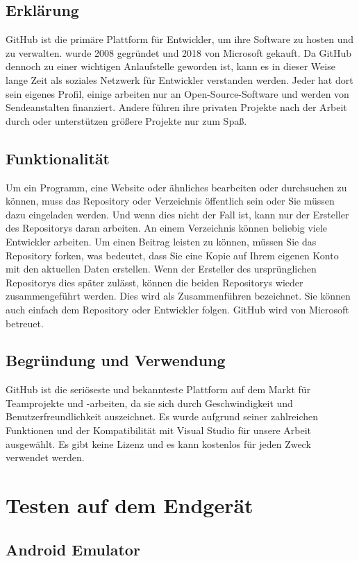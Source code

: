 \subsection*{Erklärung}
GitHub ist die primäre Plattform für Entwickler, um ihre Software zu hosten 
und zu verwalten. wurde 2008 gegründet und 2018 von Microsoft gekauft. 
Da GitHub dennoch zu einer wichtigen Anlaufstelle geworden ist, 
kann es in dieser Weise lange Zeit als soziales Netzwerk für Entwickler 
verstanden werden. Jeder hat dort sein eigenes Profil, einige arbeiten 
nur an Open-Source-Software und werden von Sendeanstalten finanziert. 
Andere führen ihre privaten Projekte nach der Arbeit durch oder unterstützen 
größere Projekte nur zum Spaß.
\subsection*{Funktionalität}
Um ein Programm, eine Website oder ähnliches bearbeiten oder durchsuchen zu können, 
muss das Repository oder Verzeichnis öffentlich sein oder Sie müssen dazu eingeladen 
werden. Und wenn dies nicht der Fall ist, kann nur der Ersteller des Repositorys 
daran arbeiten. An einem Verzeichnis können beliebig viele Entwickler arbeiten. 
Um einen Beitrag leisten zu können, müssen Sie das Repository forken, was bedeutet, 
dass Sie eine Kopie auf Ihrem eigenen Konto mit den aktuellen Daten erstellen. 
Wenn der Ersteller des ursprünglichen Repositorys dies später zulässt, können die 
beiden Repositorys wieder zusammengeführt werden. Dies wird als Zusammenführen 
bezeichnet. Sie können auch einfach dem Repository oder Entwickler folgen. 
GitHub wird von Microsoft betreuet.
\subsection*{Begründung und Verwendung}
GitHub ist die seriöseste und bekannteste Plattform auf dem Markt für Teamprojekte 
und -arbeiten, da sie sich durch Geschwindigkeit und Benutzerfreundlichkeit 
auszeichnet. Es wurde aufgrund seiner zahlreichen Funktionen und der Kompatibilität 
mit Visual Studio für unsere Arbeit ausgewählt. Es gibt keine Lizenz und es kann 
kostenlos für jeden Zweck verwendet werden.
\newpage

\section{Testen auf dem Endgerät}
\subsection{Android Emulator}
\newpage

